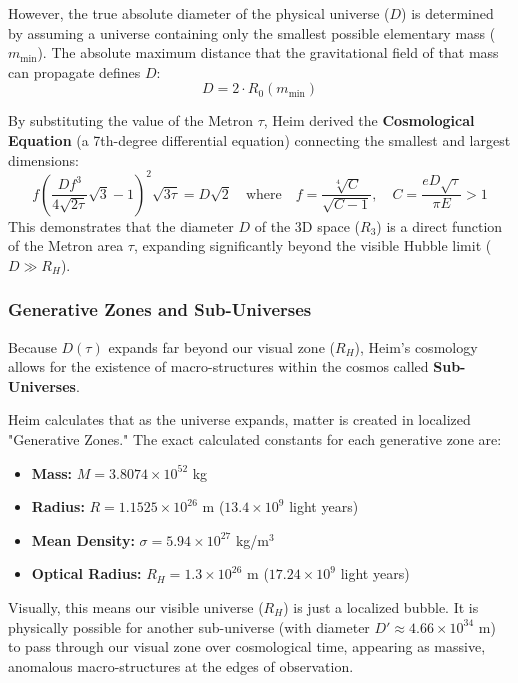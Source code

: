 \documentclass[11pt,a4paper,oneside]{article}
\begin{document}
However, the true absolute diameter of the physical universe ($D$) is determined by assuming a universe containing only the smallest possible elementary mass ($m_{\min}$). The absolute maximum distance that the gravitational field of that mass can propagate defines $D$:
\begin{equation}
    D = 2 \cdot R_0(m_{\min})
\end{equation}

By substituting the value of the Metron $\tau$, Heim derived the \textbf{Cosmological Equation} (a 7th-degree differential equation) connecting the smallest and largest dimensions:
\begin{equation}
    f \left(\frac{D f^3}{4\sqrt{2\tau}}\sqrt{3}-1 \right)^2\sqrt{3\tau} = D\sqrt{2} \quad \text{where} \quad f = \frac{\sqrt[4]{C}}{\sqrt{C-1}}, \quad C = \frac{eD\sqrt{\tau}}{\pi E} > 1
\end{equation}
This demonstrates that the diameter $D$ of the 3D space ($R_3$) is a direct function of the Metron area $\tau$, expanding significantly beyond the visible Hubble limit ($D \gg R_H$).

\subsubsection{Generative Zones and Sub-Universes}
Because $D(\tau)$ expands far beyond our visual zone ($R_H$), Heim's cosmology allows for the existence of macro-structures within the cosmos called \textbf{Sub-Universes}. 

Heim calculates that as the universe expands, matter is created in localized "Generative Zones." The exact calculated constants for each generative zone are:
\begin{itemize}
    \item \textbf{Mass:} $M = 3.8074 \times 10^{52}$ kg
    \item \textbf{Radius:} $R = 1.1525 \times 10^{26}$ m ($13.4 \times 10^9$ light years)
    \item \textbf{Mean Density:} $\sigma = 5.94 \times 10^{27}$ kg/m$^3$
    \item \textbf{Optical Radius:} $R_H = 1.3 \times 10^{26}$ m ($17.24 \times 10^9$ light years)
\end{itemize}

Visually, this means our visible universe ($R_H$) is just a localized bubble. It is physically possible for another sub-universe (with diameter $D' \approx 4.66 \times 10^{34}$ m) to pass through our visual zone over cosmological time, appearing as massive, anomalous macro-structures at the edges of observation.
\end{document}
